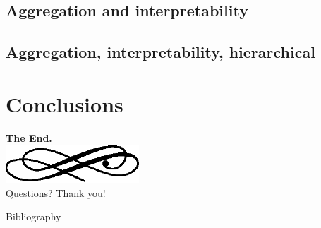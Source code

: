 \subsection{Aggregation and interpretability}

\subsection{Aggregation, interpretability, hierarchical}

\section{Conclusions}





\begin{frame}
  \begin{center}
    \textbf{\calligra\Huge The End.}\\
    \includegraphics[width=5cm]{img/ornament.eps}\\[1cm]
    {\huge\calligra Questions? Thank you!}
  \end{center}
\end{frame}


\backupbegin

\begin{frame}[allowframebreaks]{Bibliography}
  \scriptsize
  
\end{frame}


\backupend



